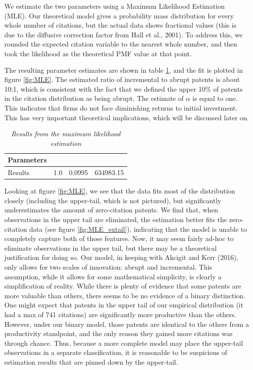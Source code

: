 \documentclass[letterpaper,12pt]{article}
\theoremstyle{definition}
\begin{document}
We estimate the two parameters using a Maximum Likelihood Estimation (MLE). Our theoretical model gives a probability mass distribution for every whole number of citations, but the actual data shows fractional values (this is due to the diffusive correction factor from Hall et al., 2001). To address this, we rounded the expected citation variable to the nearest whole number, and then took the likelihood as the theoretical PMF value at that point.

The resulting parameter estimates are shown in table \ref{tab:MLETable}, and the fit is plotted in figure \ref{fig:MLE}. The estimated ratio of incremental to abrupt patents is about 10:1, which is consistent with the fact that we defined the upper 10\% of patents in the citation distribution as being abrupt. The estimate of $\alpha$ is equal to one. This indicates that firms do not face diminishing returns to initial investment. This has very important theoretical implications, which will be discussed later on.

\begin{table}[htbp]\centering \captionsetup{width=5.8in}
    \caption{\label{tab:MLETable}\textit{Results from the maximum likelihood estimation}}
	\centering
	\begin{tabular}{>{\small}l >{\small}l >{\small}c >{\small}r}
	\toprule
	Parameters & \multicolumn{1}{c}{$\alpha$} & \multicolumn{1}{c}{$\frac{\lambda_{abr, int} + \tau}{\lambda_{inc,0}}$} & \multicolumn{1}{c}{Criterion}\\
	\midrule
	Results & 1.0 & 0.0995 & 634983.15\\
	\bottomrule
	\end{tabular}
\end{table}

Looking at figure \ref{fig:MLE}, we see that the data fits most of the distribution closely (including the upper-tail, which is not pictured), but significantly underestimates the amount of zero-citation patents. We find that, when observations in the upper tail are eliminated, the estimation better fits the zero-citation data (see figure \ref{fig:MLE_extail}), indicating that the model is unable to completely capture both of those features. Now, it may seem fairly ad-hoc to eliminate observations in the upper tail, but there may be a theoretical justification for doing so. Our model, in keeping with Akcigit and Kerr (2016), only allows for two scales of innovation: abrupt and incremental. This assumption, while it allows for some mathematical simplicity, is clearly a simplification of reality. While there is plenty of evidence that some patents are more valuable than others, there seems to be no evidence of a binary distinction. One might expect that patents in the upper tail of our empirical distribution (it had a max of 741 citations) are significantly more productive than the others. However, under our binary model, those patents are identical to the others from a productivity standpoint, and the only reason they gained more citations was through chance. Thus, because a more complete model may place the upper-tail observations in a separate classification, it is reasonable to be suspicious of estimation results that are pinned down by the upper-tail.
\end{document}
